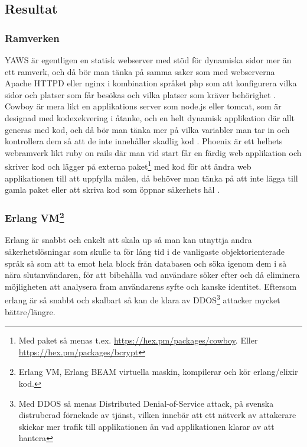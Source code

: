 \documentclass[12pt]{article}
\begin{document}
\subsection{ Resultat}
\subsubsection*{Ramverken}
YAWS är egentligen en statisk webserver med stöd för dynamiska sidor mer än ett ramverk, och då bör man tänka på samma saker som med webserverna Apache HTTPD eller nginx i kombination språket php som att konfigurera vilka sidor och platser som får besökas och vilka platser som kräver behörighet \cite{yaws}.
Cowboy är mera likt en applikations server som node.js eller tomcat, som är designad med kodexekvering i åtanke, och en helt dynamisk applikation där allt generas med kod, och då bör man tänka mer på vilka variabler man tar in och kontrollera dem så att de inte innehåller skadlig kod \cite{cowboy}.
Phoenix är ett helhets webramverk likt ruby on rails där man vid start får en färdig web applikation och skriver kod och lägger på externa paket\footnote{Med paket så menas t.ex.
\url{https://hex.pm/packages/cowboy}.
Eller \url{https://hex.pm/packages/bcrypt}} med kod för att ändra web applikationen till att uppfylla målen, då behöver man tänka på att inte lägga till gamla paket eller att skriva kod som öppnar säkerhets hål \cite{phoenix/ruby,phoenix/rails,phoenix}.
\subsubsection*{Erlang VM\footnote{Erlang VM, Erlang BEAM virtuella maskin, kompilerar och kör erlang/elixir kod\cite{erlang}.}}
	Erlang är snabbt och enkelt att skala up så man kan utnyttja andra säkerhetslösningar som skulle ta för lång tid i de vanligaste objektorienterade språk  så som att ta emot hela block från databasen och söka igenom dem i så nära slutanvändaren, för att bibehålla vad användare söker efter och då eliminera möjligheten att analysera fram användarens syfte och kanske identitet\cite{database}.
Eftersom erlang är så snabbt och skalbart så kan de klara av DDOS\footnote{Med DDOS så menas Distributed Denial-of-Service attack, på svenska distruberad förnekade av tjänst, vilken innebär att ett nätverk av attakerare skickar mer trafik till applikationen än vad applikationen klarar av att hantera} attacker mycket bättre/längre.\cite{resource-safe}
\end{document}
